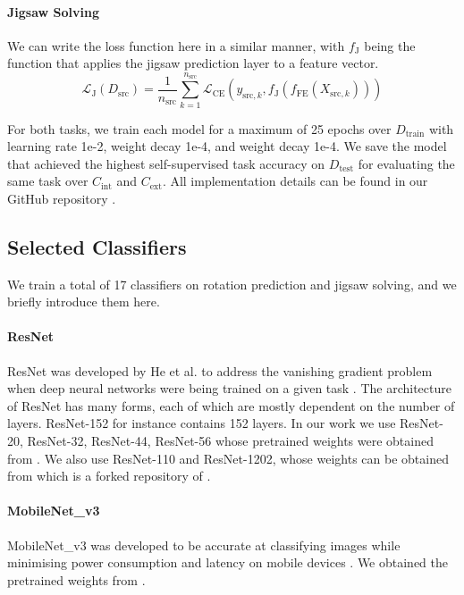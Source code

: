 \documentclass{article}
\begin{document}
\paragraph{Jigsaw Solving} We can write the loss function here in a similar manner, with $f_\text{J}$ being the function that applies the jigsaw prediction layer to a feature vector.
\begin{equation}
  \mathcal{L}_\text{J}(D_\text{src}) = \frac{1}{n_\text{src}}\sum_{k = 1}^{n_\text{src}} \mathcal{L}_\text{CE}(y_{\text{src}, k}, f_\text{J}(f_\text{FE}(X_{\text{src}, k})))
\end{equation}

For both tasks, we train each model for a maximum of 25 epochs over $D_\text{train}$ with learning rate 1e-2, weight decay 1e-4, and weight decay 1e-4. We save the model that achieved the highest self-supervised task accuracy on $D_\text{test}$ for evaluating the same task over $C_\text{int}$ and $C_\text{ext}$. All implementation details can be found in our GitHub repository \cite{Koh-u7122029-autoeval-baselines}.

\subsection{Selected Classifiers}
We train a total of 17 classifiers on rotation prediction and jigsaw solving, and we briefly introduce them here.
\paragraph{ResNet} ResNet was developed by He et al. to address the vanishing gradient problem when deep neural networks were being trained on a given task \cite{DBLP:journals/corr/HeZRS15}. The architecture of ResNet has many forms, each of which are mostly dependent on the number of layers. ResNet-152 for instance contains 152 layers. In our work we use ResNet-20, ResNet-32, ResNet-44, ResNet-56 whose pretrained weights were obtained from \cite{Chen-pytorch-cifar-models}. We also use ResNet-110 and ResNet-1202, whose weights can be obtained from \cite{Koh-pytorch-resnet-cifar10} which is a forked repository of \cite{Idelbayev18a}.

\paragraph{MobileNet\_v3} MobileNet\_v3 was developed to be accurate at classifying images while minimising power consumption and latency on mobile devices \cite{DBLP:journals/corr/abs-1905-02244}. We obtained the pretrained weights from \cite{Chen-pytorch-cifar-models}.
\end{document}
